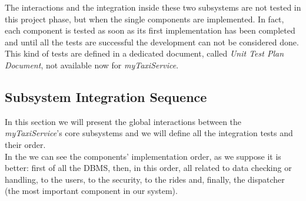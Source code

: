 \documentclass[\mainpath/main]{subfiles}
\begin{document}
\begin{center}
\end{center}

The interactions and the integration inside these two subsystems are not tested in this project phase, but when the single components are implemented. In fact, each component is tested as soon as its first implementation has been completed and until all the tests are successful the development can not be considered done.\\
This kind of tests are defined in a dedicated document, called \textit{Unit Test Plan Document}, not available now for \textit{myTaxiService}.

\subsection{Subsystem Integration Sequence}
\label{IntegrationStrategy:SequenceofComponent_FunctionIntegration:SubsystemIntegrationSequence}
In this section we will present the global interactions between the \textit{myTaxiService}'s core subsystems and we will define all the integration tests and their order.\\
In the %
we can see the components' implementation order, as we suppose it is better: first of all the DBMS, then, in this order, all related to data checking or handling, to the users, to the security, to the rides and, finally, the dispatcher (the most important component in our system).
\begin{center}
\end{center}
\end{document}
